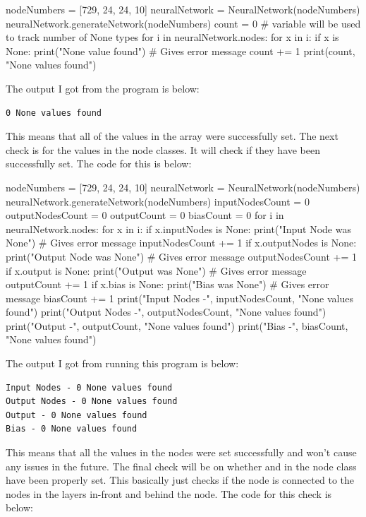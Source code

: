 \documentclass{report}
\begin{document}
\newpage
\begin{python}
nodeNumbers = [729, 24, 24, 10]
neuralNetwork = NeuralNetwork(nodeNumbers)
neuralNetwork.generateNetwork(nodeNumbers)
count = 0 # variable will be used to track number of None types
for i in neuralNetwork.nodes:
    for x in i:
        if x is None:
            print("None value found") # Gives error message 
            count += 1
print(count, "None values found")
\end{python}
The output I got from the program is below:
\begin{verbatim}
0 None values found
\end{verbatim}
This means that all of the values in the array were successfully set. 
\newline
The next check is for the values in the node classes. It will check if they have been successfully set. The code for this is below:
\begin{python}
nodeNumbers = [729, 24, 24, 10]
neuralNetwork = NeuralNetwork(nodeNumbers)
neuralNetwork.generateNetwork(nodeNumbers)
inputNodesCount = 0 
outputNodesCount = 0 
outputCount = 0 
biasCount = 0 
for i in neuralNetwork.nodes:
    for x in i:
        if x.inputNodes is None:
            print("Input Node was None") # Gives error message 
            inputNodesCount += 1
        if x.outputNodes is None:
            print("Output Node was None") # Gives error message 
            outputNodesCount += 1
        if x.output is None:
            print("Output was None") # Gives error message 
            outputCount += 1
        if x.bias is None:
            print("Bias was None") # Gives error message 
            biasCount += 1
print("Input Nodes -", inputNodesCount, "None values found")
print("Output Nodes -", outputNodesCount, "None values found")
print("Output -", outputCount, "None values found")
print("Bias -", biasCount, "None values found")
\end{python}
The output I got from running this program is below:
\begin{verbatim}
Input Nodes - 0 None values found
Output Nodes - 0 None values found
Output - 0 None values found
Bias - 0 None values found
\end{verbatim}
This means that all the values in the nodes were set successfully and won't cause any issues in the future.
\newline
The final check will be on whether  and  in the node class have been properly set. This basically just checks if the node is connected to the nodes in the layers in-front and behind the node. The code for this check is below:
\end{document}
